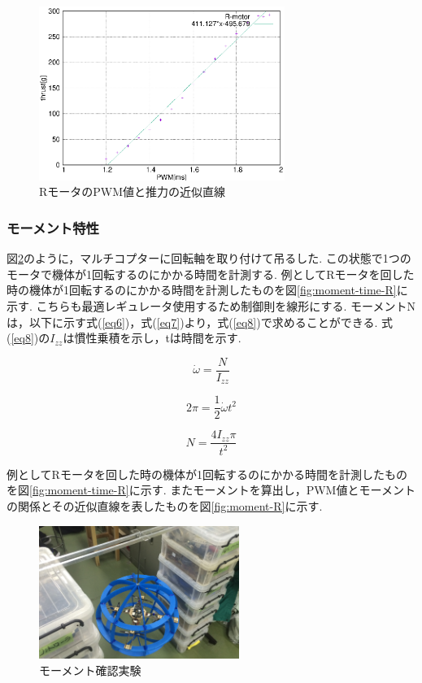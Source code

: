 \documentclass[12pt,oneside]{sotsuken_paper}
\begin{document}
\begin{figure}[htbp]
	\begin{center}
		\includegraphics[width=80mm]{image/thrust/thrust-R-kinji.eps}
		\caption{RモータのPWM値と推力の近似直線}
		\label{fig:thrust-R-kinji}
	\end{center}
\end{figure}

\subsubsection{モーメント特性}
図\ref{fig:moment-test}のように，マルチコプターに回転軸を取り付けて吊るした.
この状態で1つのモータで機体が1回転するのにかかる時間を計測する.
例としてRモータを回した時の機体が1回転するのにかかる時間を計測したものを図\ref{fig:moment-time-R}に示す.
こちらも最適レギュレータ使用するため制御則を線形にする.
モーメントNは，以下に示す式(\ref{eq6})，式(\ref{eq7})より，式(\ref{eq8})で求めることができる.
式(\ref{eq8})の\(I_{zz}\)は慣性乗積を示し，tは時間を示す.

\begin{equation}
	\dot{\omega} = \frac{N}{I_{zz}}
	\label{eq6}
\end{equation}

\begin{equation}
	2\pi = \frac{1}{2}\dot{\omega}{t^2}
	\label{eq7}
\end{equation}

\begin{equation}
	N = \frac{4{I_{zz}}\pi}{t^2}
	\label{eq8}
\end{equation}


例としてRモータを回した時の機体が1回転するのにかかる時間を計測したものを図\ref{fig:moment-time-R}に示す.
またモーメントを算出し，PWM値とモーメントの関係とその近似直線を表したものを図\ref{fig:moment-R}に示す.

\begin{figure}[htbp]
	\begin{center}
		\includegraphics[width=65mm]{image/moment/moment-test.jpg}
		\caption{モーメント確認実験}
		\label{fig:moment-test}
	\end{center}
\end{figure}
\end{document}

